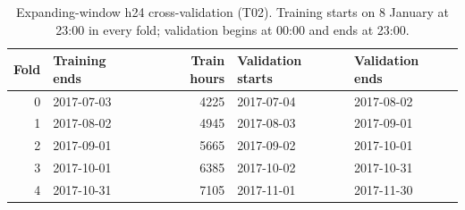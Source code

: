 \begin{table}[H]\centering\small
\caption{Expanding-window h24 cross-validation (T02). Training starts on 8 January at 23:00 in every fold; validation begins at 00:00 and ends at 23:00.}\label{tab:folds}
\setlength{\tabcolsep}{4pt}
\begin{tabular}{rlrll}
\toprule
Fold & Training ends & Train hours & Validation starts & Validation ends \\
\midrule
\num{0} & 2017-07-03 & \num{4225} & 2017-07-04 & 2017-08-02 \\
\num{1} & 2017-08-02 & \num{4945} & 2017-08-03 & 2017-09-01 \\
\num{2} & 2017-09-01 & \num{5665} & 2017-09-02 & 2017-10-01 \\
\num{3} & 2017-10-01 & \num{6385} & 2017-10-02 & 2017-10-31 \\
\num{4} & 2017-10-31 & \num{7105} & 2017-11-01 & 2017-11-30 \\
\bottomrule\end{tabular}
\end{table}
